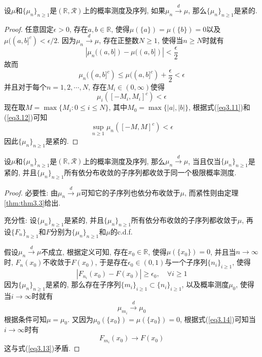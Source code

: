 \documentclass[cn, 12pt, math=mtpro2, bibstyle=apa, blue, twocol]{elegantbook}
\newcommand{\R}{\mathbb{R}}
\begin{document}
\begin{theorem}\label{thm:thm3.3}
  设$\mu$和$\{\mu_n\}_{n\ge1}$是$(\R,\mathcal{R})$上的概率测度及序列, 如果$\mu_n\xrightarrow{d}\mu$, 那么$\{\mu_n\}_{n\ge1}$是紧的.
\end{theorem}
\begin{proof}
  任意固定$\epsilon>0$, 存在$a, b\in\R$, 使得$\mu(\{a\})=\mu(\{b\})=0$以及$\mu((a,b]^c)<\epsilon/2$. 因为$\mu_n\xrightarrow{d}\mu$, 存在正整数$N\geq 1$, 使得当$n\geq N$时就有
  $$\left|\mu_n((a,b])-\mu((a,b])\right|<\frac{\epsilon}{2}$$
  故而
  \begin{equation}\label{eq3.11}
    \mu_n((a,b]^c)\leq\mu((a,b]^c)+\frac{\epsilon}{2}<\epsilon
  \end{equation}
  并且对于每个$n=1,2,\cdots,N$, 存在$M_i\in(0,\infty)$使得
  \begin{equation}\label{eq3.12}
    \mu_i([-M_i,M_i]^c)<\epsilon
  \end{equation}
  现在取$M=\max\{M_i: 0\leq i\leq N\}$, 其中$M_0=\max\{|a|,|b|\}$, 根据式(\ref{eq3.11})和(\ref{eq3.12})可知
  $$\sup_{n\ge1}\mu_n([-M,M]^c)<\epsilon$$
  因此$\{\mu_n\}_{n\ge1}$是紧的.
\end{proof}

\begin{theorem}\label{thm:thm3.5}
   设$\mu$和$\{\mu_n\}_{n\ge1}$是$(\R,\mathcal{R})$上的概率测度及序列, 那么$\mu_n\xrightarrow{d}\mu$, 当且仅当$\{\mu_n\}_{n\ge1}$是紧的, 并且$\{\mu_n\}_{n\ge1}$所有依分布收敛的子序列都收敛于同一个极限概率测度.
\end{theorem}
\begin{proof}
  必要性: 由$\mu_n\xrightarrow{d}\mu$可知它的子序列也依分布收敛于$\mu$, 而紧性则由定理\ref{thm:thm3.3}给出.

  充分性: 设$\{\mu_n\}_{n\ge1}$是紧的, 并且$\{\mu_n\}_{n\ge1}$所有依分布收敛的子序列都收敛于$\mu$, 再设$\{F_n\}_{n\ge1}$和$F$分别为$\{\mu_n\}_{n\ge1}$和$\mu$的c.d.f.

   假设$\mu_n\xrightarrow{d}\mu$不成立, 根据定义可知, 存在$x_0\in\R$, 使得$\mu(\{x_0\})=0$, 并且当$n\to\infty$时, $F_n(x_0)$不收敛于$F(x_0)$, 于是存在$\epsilon_0\in(0,1)$与一个子序列$\{n_i\}_{i\ge1}$, 使得
   \begin{equation}\label{eq3.13}
     |F_{n_i}(x_0)-F(x_0)|\geq\epsilon_0,\quad \forall i\geq1
   \end{equation}
   因为$\{\mu_n\}_{n\ge1}$是紧的, 那么存在子序列$\{m_i\}_{i\ge1}\subset\{n_i\}_{i\ge1}$, 以及概率测度$\mu_0$, 使得当$i\to\infty$时就有
   \begin{equation}\label{eq3.14}
     \mu_{m_i}\xrightarrow{d}\mu_0
   \end{equation}
   根据条件可知$\mu=\mu_0$. 又因为$\mu_0(\{x_0\})=\mu(\{x_0\})=0$, 根据式(\ref{eq3.14})可知当$i\to\infty$时有
   $$F_{m_i}(x_0)\to F(x_0)$$
   这与式(\ref{eq3.13})矛盾.
\end{proof}
\end{document}
